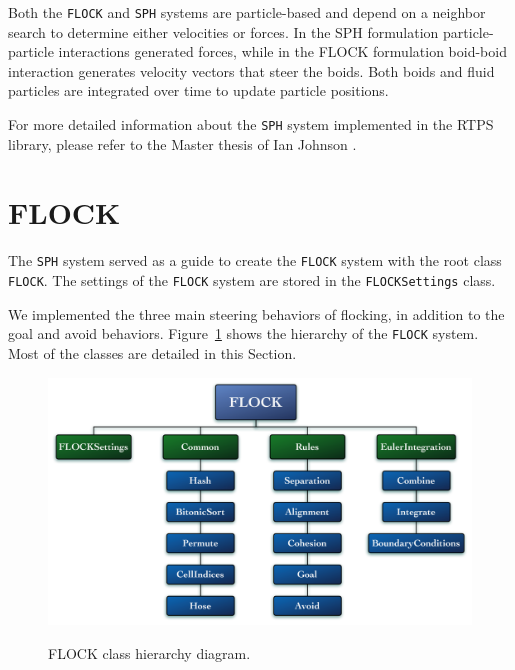 Both the \texttt{FLOCK} and \texttt{SPH} systems are particle-based and depend on a neighbor search to determine either velocities or forces. In the SPH formulation particle-particle interactions generated forces, while in the FLOCK formulation boid-boid interaction generates velocity 
vectors that steer the boids. Both boids and fluid particles are integrated over time to update particle positions.

For more detailed information about the \texttt{SPH} system implemented in the RTPS library, please refer to the Master thesis of Ian Johnson \cite{ianThesis}.

\section{FLOCK}\label{flocksection}
The \texttt{SPH} system served as a guide to create the \texttt{FLOCK} system with the root class \texttt{FLOCK}. The settings of the \texttt{FLOCK} system are stored in the \texttt{FLOCKSettings} class. 

We implemented the three main steering behaviors of flocking, in addition to the goal and avoid behaviors. Figure~\ref{flockdiagram} shows the hierarchy of the \texttt{FLOCK} system. Most of the classes are detailed in this Section. 

\begin{figure}[htbp]
\begin{center}
\includegraphics[scale=0.42]{figures/FLOCKdiagramMyrna.pdf}
\caption{FLOCK class hierarchy diagram.} 
\label{flockdiagram}
\end{center}
\end{figure}



